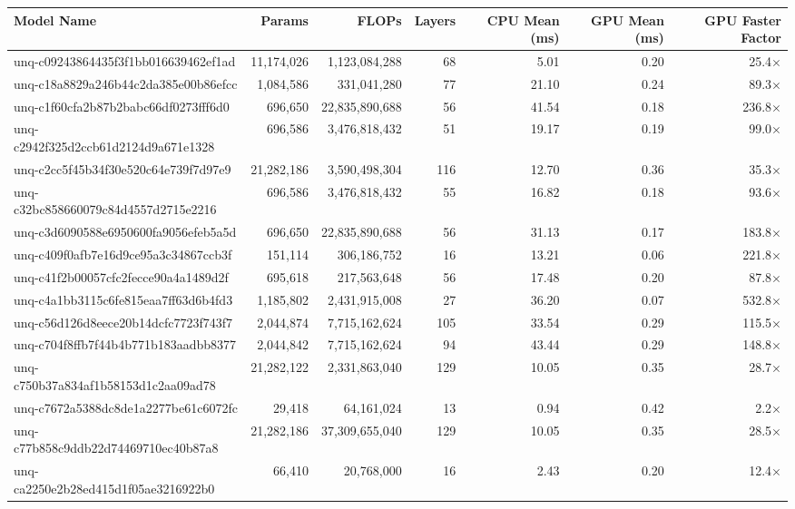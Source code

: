 \begin{table}[h!]
\centering
\fontsize{7}{9}\selectfont
\begin{tabular}{lrrrrrr}
\toprule
\textbf{Model Name} & \textbf{Params} & \textbf{FLOPs} & \textbf{Layers} & \textbf{CPU Mean (ms)} & \textbf{GPU Mean (ms)} & \textbf{GPU Faster Factor} \\
\midrule
unq-c09243864435f3f1bb016639462ef1ad & 11,174,026 & 1,123,084,288 & 68 & 5.01 & 0.20 & 25.4$\times$ \\
unq-c18a8829a246b44c2da385e00b86efcc & 1,084,586 & 331,041,280 & 77 & 21.10 & 0.24 & 89.3$\times$ \\
unq-c1f60cfa2b87b2babc66df0273fff6d0 & 696,650 & 22,835,890,688 & 56 & 41.54 & 0.18 & 236.8$\times$ \\
unq-c2942f325d2ccb61d2124d9a671e1328 & 696,586 & 3,476,818,432 & 51 & 19.17 & 0.19 & 99.0$\times$ \\
unq-c2cc5f45b34f30e520c64e739f7d97e9 & 21,282,186 & 3,590,498,304 & 116 & 12.70 & 0.36 & 35.3$\times$ \\
unq-c32bc858660079c84d4557d2715e2216 & 696,586 & 3,476,818,432 & 55 & 16.82 & 0.18 & 93.6$\times$ \\
unq-c3d6090588e6950600fa9056efeb5a5d & 696,650 & 22,835,890,688 & 56 & 31.13 & 0.17 & 183.8$\times$ \\
unq-c409f0afb7e16d9ce95a3c34867ccb3f & 151,114 & 306,186,752 & 16 & 13.21 & 0.06 & 221.8$\times$ \\
unq-c41f2b00057cfc2fecce90a4a1489d2f & 695,618 & 217,563,648 & 56 & 17.48 & 0.20 & 87.8$\times$ \\
unq-c4a1bb3115c6fe815eaa7ff63d6b4fd3 & 1,185,802 & 2,431,915,008 & 27 & 36.20 & 0.07 & 532.8$\times$ \\
unq-c56d126d8eece20b14dcfc7723f743f7 & 2,044,874 & 7,715,162,624 & 105 & 33.54 & 0.29 & 115.5$\times$ \\
unq-c704f8ffb7f44b4b771b183aadbb8377 & 2,044,842 & 7,715,162,624 & 94 & 43.44 & 0.29 & 148.8$\times$ \\
unq-c750b37a834af1b58153d1c2aa09ad78 & 21,282,122 & 2,331,863,040 & 129 & 10.05 & 0.35 & 28.7$\times$ \\
unq-c7672a5388dc8de1a2277be61c6072fc & 29,418 & 64,161,024 & 13 & 0.94 & 0.42 & 2.2$\times$ \\
unq-c77b858c9ddb22d74469710ec40b87a8 & 21,282,186 & 37,309,655,040 & 129 & 10.05 & 0.35 & 28.5$\times$ \\
unq-ca2250e2b28ed415d1f05ae3216922b0 & 66,410 & 20,768,000 & 16 & 2.43 & 0.20 & 12.4$\times$ \\

\end{tabular}
\end{table}
